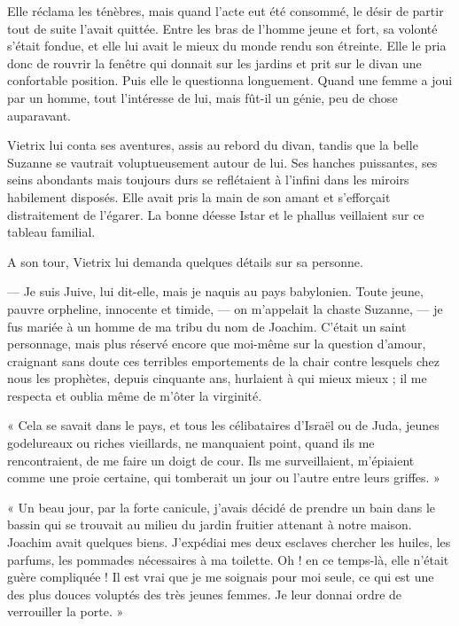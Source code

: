 \documentclass[a4paper, 11pt, oneside, polutonikogreek, french]{article}
\begin{document}
Elle réclama les ténèbres, mais quand l'acte eut été consommé, le désir de partir tout de suite l'avait quittée. Entre les bras de l'homme jeune et fort, sa volonté s'était fondue, et elle lui avait le mieux du monde rendu son étreinte. Elle le pria donc de rouvrir la fenêtre qui donnait sur les jardins et prit sur le divan une confortable position. Puis elle le questionna longuement. Quand une femme a joui par un homme, tout l'intéresse de lui, mais fût-il un génie, peu de chose auparavant.

Vietrix lui conta ses aventures, assis au rebord du divan, tandis que la belle Suzanne se vautrait voluptueusement autour de lui. Ses hanches puissantes, ses seins abondants mais toujours durs se reflétaient à l'infini dans les miroirs habilement disposés. Elle avait pris la main de son amant et s'efforçait distraitement de l'égarer. La bonne déesse Istar et le phallus veillaient sur ce tableau familial.

A son tour, Vietrix lui demanda quelques détails sur sa personne.

\bigskip
\centerline{\EightStarTaper}
\centerline{\EightStarTaper\EightStarTaper}
\bigskip

--- Je suis Juive, lui dit-elle, mais je naquis au pays babylonien. Toute jeune, pauvre orpheline, innocente et timide, --- on m'appelait la chaste Suzanne, --- je fus mariée à un homme de ma tribu du nom de Joachim. C'était un saint personnage, mais plus réservé encore que moi-même sur la question d'amour, craignant sans doute ces terribles emportements de la chair contre lesquels chez nous les prophètes, depuis cinquante ans, hurlaient à qui mieux mieux ; il me respecta et oublia même de m'ôter la virginité.

« Cela se savait dans le pays, et tous les célibataires d'Israël ou de Juda, jeunes godelureaux ou riches vieillards, ne manquaient point, quand ils me rencontraient, de me faire un doigt de cour. Ils me surveillaient, m'épiaient comme une proie certaine, qui tomberait un jour ou l'autre entre leurs griffes. »

« Un beau jour, par la forte canicule, j'avais décidé de prendre un bain dans le bassin qui se trouvait au milieu du jardin fruitier attenant à notre maison. Joachim avait quelques biens. J'expédiai mes deux esclaves chercher les huiles, les parfums, les pommades nécessaires à ma toilette. Oh ! en ce temps-là, elle n'était guère compliquée ! Il est vrai que je me soignais pour moi seule, ce qui est une des plus douces voluptés des très jeunes femmes. Je leur donnai ordre de verrouiller la porte. »
\end{document}
